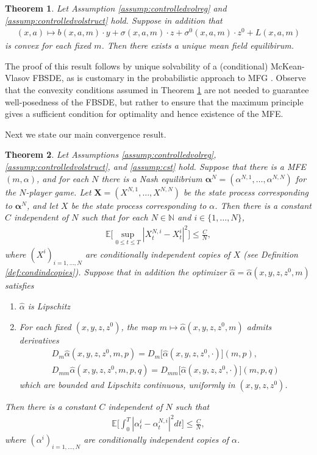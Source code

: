 \documentclass[11pt,reqno]{amsart}
\numberwithin{equation}{section}
\newtheorem{theorem}{Theorem}[section]
\theoremstyle{definition}
\def\E{{\mathbb E}}
\def\N{{\mathbb N}}
\newcommand{\bX}{\mathbf{X}}
\def \E{\mathbb{E}}
\def \N{\mathbb{N}}
\begin{document}
\begin{theorem} \label{thm:existence}
Let Assumption \ref{assump:controlledvolreg} and \ref{assump:controlledvolstruct} hold. Suppose in addition that
\begin{align*}
(x,a) \mapsto b(x,a,m) \cdot y + \sigma(x,a,m) \cdot z + \sigma^0(x,a,m) \cdot z^0 + L(x,a,m)
\end{align*}
is convex for each fixed $m$. Then there exists a unique mean field equilibirum.
\end{theorem}




The proof of this result follows by unique solvability of a (conditional) McKean-Vlasov FBSDE, as is customary in the probabilistic approach to MFG \cite{cardelbook2}.
Observe that the convexity conditions assumed in Theorem \ref{thm:existence} are not needed to guarantee well-posedness of the FBSDE, but rather to ensure that the maximum principle gives a sufficient condition for optimality and hence existence of the MFE.

Next we state our main convergence result.

\begin{theorem} \label{thm:pocvolcontrol}
Let Assumptions \ref{assump:controlledvolreg}, \ref{assump:controlledvolstruct}, and \ref{assump:cst} hold. Suppose that there is a MFE $(m,\alpha)$, and for each $N$ there is a Nash equilibrium $\bm \alpha^N = (\alpha^{N,1},\dots,\alpha^{N,N})$ for the $N$-player game. Let $\bX = (X^{N,1},\dots,X^{N,N})$ be the state process corresponding to $\bm \alpha^N$, and let $X$ be the state process corresponding to $\alpha$. Then there is a constant $C$ independent of $N$ such that for each $N \in \N$ and $i \in \{1,\dots,N\}$, 
\begin{align*}
\E\Big[\sup_{0 \leq t \leq T} |X_t^{N,i} - X_t^i|^2\Big] \leq \frac{C}{N}, 
\end{align*}
where $(X^i)_{i = 1,\dots,N}$ are conditionally independent copies of $X$ (see Definition \ref{def:condindcopies}). Suppose that in addition the optimizer $\widehat{\alpha} = \widehat{\alpha}(x,y,z,z^0,m)$ satisfies
\begin{enumerate}
\item $\hat{\alpha}$ is Lipschitz
\item For each fixed $(x,y,z,z^0)$, the map $m \mapsto \widehat{\alpha}(x,y,z,z^0,m)$ admits derivatives 
\begin{align*}
D_m \widehat{\alpha}(x,y,z,z^0,m,p) = D_m\big[\widehat{\alpha}(x,y,z,z^0, \cdot)](m,p), \\
 D_{mm} \widehat{\alpha}(x,y,z,z^0,m,p,q) = D_{mm}\big[\widehat{\alpha}(x,y,z,z^0, \cdot)](m,p,q)
\end{align*}
which are bounded and Lipschitz continuous, uniformly in $(x,y,z,z^0)$.
\end{enumerate}
Then there is a constant $C$ independent of $N$ such that
\begin{align*}
\E\bigg[\int_0^T |\alpha_t^i - \alpha_t^{N,i}|^2 dt \bigg] \leq \frac{C}{N}, 
\end{align*}
where $(\alpha^i)_{i = 1,\dots,N}$ are conditionally independent copies of $\alpha$.
\end{theorem}
\end{document}
